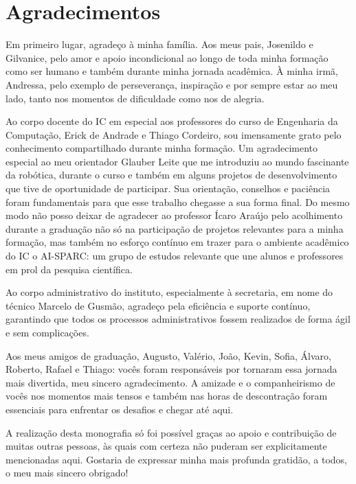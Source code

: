 \chapter*{Agradecimentos}

Em primeiro lugar, agradeço à minha família. Aos meus pais, Josenildo e Gilvanice, 
pelo amor e apoio incondicional ao longo de toda minha formação como ser humano e 
também durante minha jornada acadêmica. À minha irmã, Andressa, pelo exemplo de perseverança,
inspiração e por sempre estar ao meu lado, tanto nos momentos de dificuldade como nos de alegria. 

Ao corpo docente do IC em especial aos professores do curso de Engenharia da Computação,
Erick de Andrade e Thiago Cordeiro, sou imensamente grato pelo conhecimento compartilhado 
durante minha formação. Um agradecimento especial ao meu orientador Glauber Leite que me 
introduziu ao mundo fascinante da robótica, durante o curso e também em alguns projetos de 
desenvolvimento que tive de oportunidade de participar. Sua orientação, conselhos e paciência 
foram fundamentais para que esse trabalho chegasse a sua forma final. Do mesmo modo não 
posso deixar de agradecer ao professor Ícaro Araújo
pelo acolhimento durante a graduação não só na participação de projetos relevantes para 
a minha formação, mas também no esforço contínuo em trazer para o ambiente acadêmico do 
IC o AI-SPARC: um grupo de estudos relevante que une alunos e professores em prol da 
pesquisa científica.

Ao corpo administrativo do instituto, especialmente à secretaria, em nome do 
técnico Marcelo de Gusmão, agradeço pela eficiência e suporte contínuo, garantindo 
que todos os processos administrativos fossem realizados de forma ágil e 
sem complicações.

Aos meus amigos de graduação, Augusto, Valério, João, Kevin, Sofia, Álvaro, 
Roberto, Rafael e Thiago: vocês foram responsáveis por tornaram essa jornada 
mais divertida, meu sincero agradecimento. A amizade e o companheirismo de 
vocês nos momentos mais tensos e também nas horas de descontração foram essenciais 
para enfrentar os desafios e chegar até aqui.

A realização desta monografia só foi possível graças ao apoio e contribuição 
de muitas outras pessoas, às quais com certeza não puderam ser explicitamente 
mencionadas aqui. Gostaria de expressar minha mais profunda gratidão, a todos, 
o meu mais sincero obrigado!
